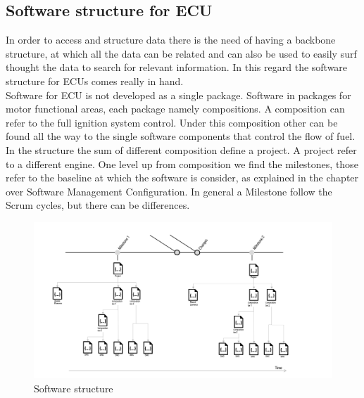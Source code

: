\documentclass[../main.tex]{subfiles}
\begin{document}
\subsection{Software structure for ECU}
In order to access and structure data there is the need of having a backbone structure, at which all the data can be related and can also be used to easily surf thought the data to search for relevant information. In this regard the software structure for \gls{ECU}s comes really in hand.\\ 
Software for \gls{ECU} is not developed as a single package. Software in packages for motor functional areas, each package namely compositions. A composition can refer to the full ignition system control. Under this composition other can be found all the way to the single software components that control the flow of fuel.\\
In the structure the sum of different composition define a project. A project refer to a different engine. One level up from composition we find the milestones, those refer to the baseline at which the software is consider, as explained in the chapter over Software Management Configuration. In general a Milestone follow the Scrum cycles, but there can be differences. \\
\begin{figure}
    \centering
    \includegraphics[width=\linewidth]{images_folder/softwarestrucutre.png}
    \caption{Software structure}
    \label{fig:SWsTR}
\end{figure}
\end{document}
